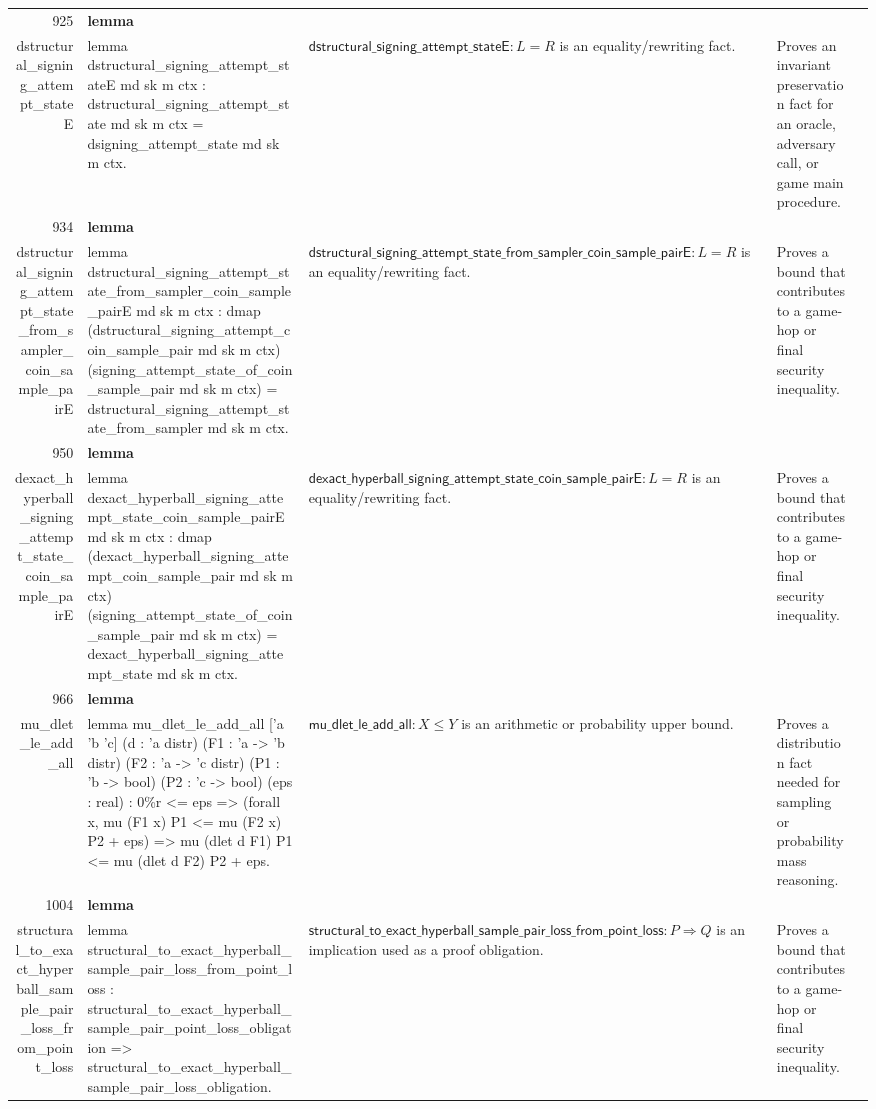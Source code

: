 \documentclass[10pt]{article}
\newcommand{\ec}[1]{\begingroup\ttfamily\scriptsize #1\endgroup}
\begin{document}
\begin{longtable}{r L{0.17\textwidth} L{0.26\textwidth} L{0.27\textwidth} L{0.20\textwidth}}
925 & \textbf{lemma}\\\ec{dstructural\_signing\_attempt\_stateE} & \ec{lemma dstructural\_signing\_attempt\_stateE md sk m ctx : dstructural\_signing\_attempt\_state md sk m ctx = dsigning\_attempt\_state md sk m ctx.} & \(\mathsf{dstructural\_signing\_attempt\_stateE} : L = R\) is an equality/rewriting fact. & Proves an invariant preservation fact for an oracle, adversary call, or game main procedure. \\
934 & \textbf{lemma}\\\ec{dstructural\_signing\_attempt\_state\_from\_sampler\_coin\_sample\_pairE} & \ec{lemma dstructural\_signing\_attempt\_state\_from\_sampler\_coin\_sample\_pairE md sk m ctx : dmap (dstructural\_signing\_attempt\_coin\_sample\_pair md sk m ctx) (signing\_attempt\_state\_of\_coin\_sample\_pair md sk m ctx) = dstructural\_signing\_attempt\_state\_from\_sampler md sk m ctx.} & \(\mathsf{dstructural\_signing\_attempt\_state\_from\_sampler\_coin\_sample\_pairE} : L = R\) is an equality/rewriting fact. & Proves a bound that contributes to a game-hop or final security inequality. \\
950 & \textbf{lemma}\\\ec{dexact\_hyperball\_signing\_attempt\_state\_coin\_sample\_pairE} & \ec{lemma dexact\_hyperball\_signing\_attempt\_state\_coin\_sample\_pairE md sk m ctx : dmap (dexact\_hyperball\_signing\_attempt\_coin\_sample\_pair md sk m ctx) (signing\_attempt\_state\_of\_coin\_sample\_pair md sk m ctx) = dexact\_hyperball\_signing\_attempt\_state md sk m ctx.} & \(\mathsf{dexact\_hyperball\_signing\_attempt\_state\_coin\_sample\_pairE} : L = R\) is an equality/rewriting fact. & Proves a bound that contributes to a game-hop or final security inequality. \\
966 & \textbf{lemma}\\\ec{mu\_dlet\_le\_add\_all} & \ec{lemma mu\_dlet\_le\_add\_all ['a 'b 'c] (d : 'a distr) (F1 : 'a -> 'b distr) (F2 : 'a -> 'c distr) (P1 : 'b -> bool) (P2 : 'c -> bool) (eps : real) : 0\%r <= eps => (forall x, mu (F1 x) P1 <= mu (F2 x) P2 + eps) => mu (dlet d F1) P1 <= mu (dlet d F2) P2 + eps.} & \(\mathsf{mu\_dlet\_le\_add\_all} : X \le Y\) is an arithmetic or probability upper bound. & Proves a distribution fact needed for sampling or probability mass reasoning. \\
1004 & \textbf{lemma}\\\ec{structural\_to\_exact\_hyperball\_sample\_pair\_loss\_from\_point\_loss} & \ec{lemma structural\_to\_exact\_hyperball\_sample\_pair\_loss\_from\_point\_loss : structural\_to\_exact\_hyperball\_sample\_pair\_point\_loss\_obligation => structural\_to\_exact\_hyperball\_sample\_pair\_loss\_obligation.} & \(\mathsf{structural\_to\_exact\_hyperball\_sample\_pair\_loss\_from\_point\_loss} : P \Rightarrow Q\) is an implication used as a proof obligation. & Proves a bound that contributes to a game-hop or final security inequality. \\

\end{longtable}
\end{document}
